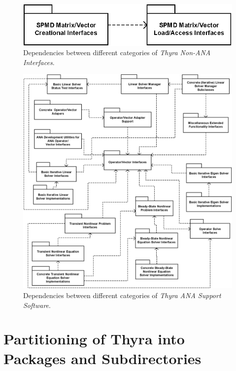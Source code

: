 \documentclass[pdf,ps2pdf,11pt]{SANDreport}
\begin{document}
{\bsinglespace
\begin{figure}[p]
\begin{center}
\includegraphics*[scale=0.70]{ThyraNonANAInterfaces}
\end{center}
\caption{
\label{thyra:fig:ThyraNonANAInterfaces}
Dependencies between different categories of {}\textit{Thyra Non-ANA Interfaces}.
}
\end{figure}
\esinglespace}

{\bsinglespace
\begin{figure}[p]
\begin{center}
\includegraphics*[scale=0.70]{ThyraANASupportSoftware}
\end{center}
\caption{
\label{thyra:fig:ThyraANASupportSoftware}
Dependencies between different categories of {}\textit{Thyra ANA Support Software}.
}
\end{figure}
\esinglespace}

%
\section{Partitioning of Thyra into Packages and Subdirectories}
%
\end{document}
